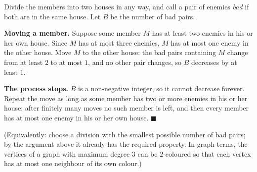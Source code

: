 Divide the members into two houses in any way, and call a pair of enemies \emph{bad} if both are in the same house. Let $B$ be the number of bad pairs.

\textbf{Moving a member.} Suppose some member $M$ has at least two enemies in his or her own house. Since $M$ has at most three enemies, $M$ has at most one enemy in the other house. Move $M$ to the other house: the bad pairs containing $M$ change from at least $2$ to at most $1$, and no other pair changes, so $B$ decreases by at least $1$.

\textbf{The process stops.} $B$ is a non-negative integer, so it cannot decrease forever. Repeat the move as long as some member has two or more enemies in his or her house; after finitely many moves no such member is left, and then every member has at most one enemy in his or her own house. $\blacksquare$

(Equivalently: choose a division with the smallest possible number of bad pairs; by the argument above it already has the required property. In graph terms, the vertices of a graph with maximum degree $3$ can be $2$-coloured so that each vertex has at most one neighbour of its own colour.)
